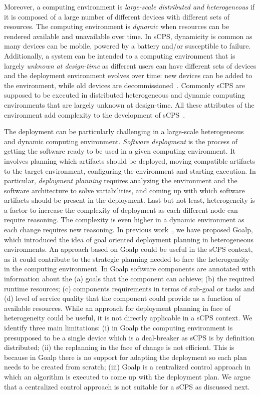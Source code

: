 Moreover, a computing environment is \emph{large-scale distributed and heterogeneous} if it is composed of a large number of different devices with different sets of resources. The computing environment is \emph{dynamic} when resources can be rendered available and unavailable over time. In sCPS, dynamicity is common as many devices can be mobile, powered by a battery and/or susceptible to failure. Additionally, a system can be intended to a computing environment that is largely \emph{unknown at design-time} as different users can have different sets of devices and the deployment environment evolves over time: new devices can be added to the environment, while old devices are decommissioned~\cite{bures_software_2015}.
Commonly sCPS are supposed to be executed in distributed heterogeneous and dynamic computing environments that are largely unknown at design-time. All these attributes of the environment add complexity to the development of sCPS~\cite{bures_software_2015}.%

The deployment can be particularly challenging in a large-scale heterogeneous and dynamic computing environment. \emph{Software deployment} is the process of getting the software ready to be used in a given computing environment\cite{carzaniga_characterization_1998}. It involves planning which artifacts should be deployed, moving compatible artifacts to the target environment, configuring the environment and starting execution. In particular, \emph{deployment planning} requires analyzing the environment and the software architecture to solve variabilities, and coming up with which software artifacts should be present in the deployment.
	Last but not least, heterogeneity is a factor to increase the complexity of deployment as each different node can require reasoning. The complexity is even higher in a dynamic environment as each change requires new reasoning.
In previous work~\cite{rodrigues_autonomic_2016}, we have proposed Goalp, which introduced the idea of goal oriented deployment planning  in heterogeneous environments. An approach based on Goalp could be useful in the sCPS context, as it could contribute to the strategic planning needed to face the heterogeneity in the computing environment. In Goalp software components are annotated with information about the (a) goals that the component can achieve; (b) the required runtime resources; (c) components requirements in terms of sub-goal or tasks and (d) level of service quality that the component could provide as a function of available resources. While an approach for deployment planning in face of heterogeneity could be useful, it is not directly applicable in a sCPS context. We identify three main limitations: (i) in Goalp the computing environment is presupposed to be a single device which is a deal-breaker as sCPS is by definition distributed; (ii) the replanning in the face of change is not efficient. This is because in Goalp there is no support for adapting the deployment so each plan needs to be created from scratch; (iii) Goalp is a centralized control approach in which an algorithm is executed to come up with the deployment plan. We argue that a centralized control approach is not suitable for a sCPS as discussed next. 

